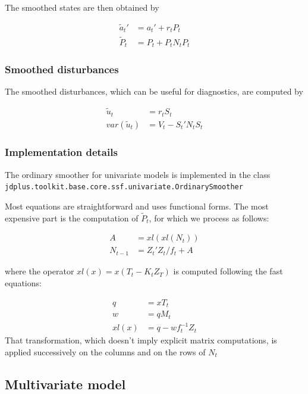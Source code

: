 \documentclass[
  letterpaper,
  DIV=11,
  numbers=noendperiod]{scrreprt}
\begin{document}
The smoothed states are then obtained by

\[
\begin{align*}
\tilde a_t' &= a_t' + r_t P_t \\
\tilde P_t &= P_t + P_t N_t P_t
\end{align*}
\]

\subsubsection{Smoothed disturbances}\label{smoothed-disturbances}

The smoothed disturbances, which can be useful for diagnostics, are
computed by

\[
\begin{align*}
\tilde u_t &= r_t S_t \\
var\left(\tilde u_t \right) &= V_t-S_t' N_t S_t
\end{align*}
\]

\subsubsection{Implementation details}\label{implementation-details}

The ordinary smoother for univariate models is implemented in the class
\texttt{jdplus.toolkit.base.core.ssf.univariate.OrdinarySmoother}

Most equations are straightforward and uses functional forms. The most
expensive part is the computation of \(\tilde P_t\), for which we
process as follows:

\[
\begin{align*}
 A &=  xl(xl(N_t)) \\
 N_{t-1} &= Z_t' Z_t / f_t + A
\end{align*}
\]

where the operator \(xl(x)=x(T_t - K_t Z_T)\) is computed following the
fast equations:

\[
\begin{align*}
q &= x T_t \\
w &= q M_t \\
xl(x) &= q - w f_t^{-1} Z_t
\end{align*}
\] That transformation, which doesn't imply explicit matrix
computations, is applied successively on the columns and on the rows of
\(N_t\)

\subsection{Multivariate model}\label{multivariate-model-1}
\end{document}
